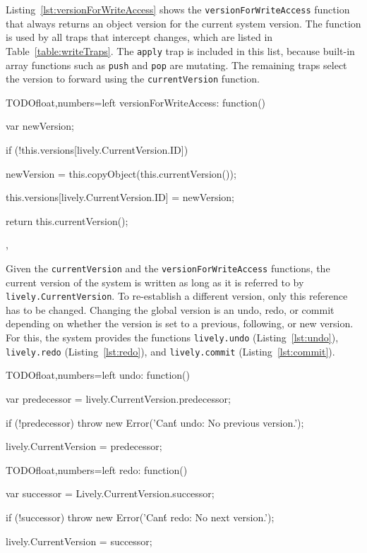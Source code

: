 Listing~\ref{lst:versionForWriteAccess} shows the \lstinline{versionForWriteAccess} function that always returns an object version for the current system version.
The function is used by all traps that intercept changes, which are listed in Table~\ref{table:writeTraps}.
The \lstinline{apply} trap is included in this list, because built-in array functions such as \lstinline{push} and \lstinline{pop} are mutating.
The remaining traps select the version to forward using the \lstinline{currentVersion} function.

\begin{code}{TODO}{float,numbers=left}
versionForWriteAccess: function() {
    var newVersion;
    
    if (!this.versions[lively.CurrentVersion.ID]) {
        newVersion = this.copyObject(this.currentVersion());
        
        this.versions[lively.CurrentVersion.ID] = newVersion;
    }
    
    return this.currentVersion();
},
\end{code}
\iffalse
\end{verbatim}\fi

Given the \lstinline{currentVersion} and the \lstinline{versionForWriteAccess} functions, the current version of the system is written as long as it is referred to by \lstinline{lively.CurrentVersion}.
To re-establish a different version, only this reference has to be changed.
Changing the global version is an undo, redo, or commit depending on whether the version is set to a previous, following, or new version.
For this, the system provides the functions \lstinline{lively.undo} (Listing~\ref{lst:undo}), \lstinline{lively.redo} (Listing~\ref{lst:redo}), and \lstinline{lively.commit} (Listing~\ref{lst:commit}).

\begin{code}{TODO}{float,numbers=left}
undo: function() {
    var predecessor = lively.CurrentVersion.predecessor;
    
    if (!predecessor) {
        throw new Error('Can\'t undo: No previous version.');
    }
    
    lively.CurrentVersion = predecessor;
}
\end{code}
\iffalse
\end{verbatim}\fi

\begin{code}{TODO}{float,numbers=left}
redo: function() {
    var successor = Lively.CurrentVersion.successor;
    
    if (!successor) {
        throw new Error('Can\'t redo: No next version.');
    }
    
    lively.CurrentVersion = successor;
}
\end{code}
\iffalse
\end{verbatim}\fi

